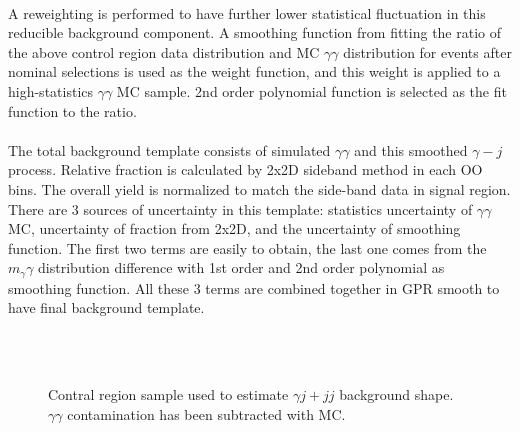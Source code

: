 \paragraph{} A reweighting is performed to have further lower statistical fluctuation in this reducible background component. A smoothing function from fitting the ratio of the above control region data distribution and MC $\gamma\gamma$ distribution for events after nominal selections is used as the weight function, and this weight is applied to a high-statistics $\gamma\gamma$ MC sample. 2nd order polynomial function is selected as the fit function to the ratio. \\

\paragraph{} The total background template consists of simulated $\gamma\gamma$ and this smoothed $\gamma-j$ process. Relative fraction is calculated by 2x2D sideband method in each OO bins. The overall yield is normalized to match the side-band data in signal region. There are 3 sources of uncertainty in this template: statistics uncertainty of $\gamma\gamma$ MC, uncertainty of fraction from 2x2D, and the uncertainty of smoothing function. The first two terms are easily to obtain, the last one comes from the $m_\gamma\gamma$ distribution difference with 1st order and 2nd order polynomial as smoothing function. All these 3 terms are combined together in GPR smooth to have final background template. 

\begin{figure}[htbp]
  \centering
   \\
   \\
  \caption{Contral region sample used to estimate $\gamma j+jj$ background shape. $\gamma\gamma$ contamination has been subtracted with MC. }
  \label{fig:bkg_CR}
\end{figure}


